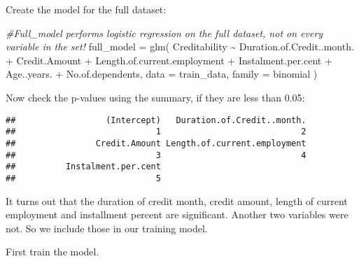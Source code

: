 \documentclass[
]{article}
\newenvironment{Shaded}{\begin{snugshade}}{\end{snugshade}}
\newcommand{\AttributeTok}[1]{\textcolor[rgb]{0.77,0.63,0.00}{#1}}
\newcommand{\CommentTok}[1]{\textcolor[rgb]{0.56,0.35,0.01}{\textit{#1}}}
\newcommand{\DecValTok}[1]{\textcolor[rgb]{0.00,0.00,0.81}{#1}}
\newcommand{\FloatTok}[1]{\textcolor[rgb]{0.00,0.00,0.81}{#1}}
\newcommand{\FunctionTok}[1]{\textcolor[rgb]{0.00,0.00,0.00}{#1}}
\newcommand{\NormalTok}[1]{#1}
\newcommand{\OtherTok}[1]{\textcolor[rgb]{0.56,0.35,0.01}{#1}}
\newcommand{\SpecialCharTok}[1]{\textcolor[rgb]{0.00,0.00,0.00}{#1}}
\begin{document}
Create the model for the full dataset:

\begin{Shaded}
\begin{Highlighting}[]
\CommentTok{\#Full\_model performs logistic regression on the full dataset, not on every variable in the set!}
\NormalTok{full\_model }\OtherTok{=} \FunctionTok{glm}\NormalTok{(}
\NormalTok{                  Creditability }\SpecialCharTok{\textasciitilde{}}\NormalTok{ Duration.of.Credit..month.}
                            \SpecialCharTok{+}\NormalTok{ Credit.Amount}
                            \SpecialCharTok{+}\NormalTok{ Length.of.current.employment}
                            \SpecialCharTok{+}\NormalTok{ Instalment.per.cent}
                            \SpecialCharTok{+}\NormalTok{ Age..years.}
                            \SpecialCharTok{+}\NormalTok{ No.of.dependents, }
                  \AttributeTok{data =}\NormalTok{ train\_data, }
                  \AttributeTok{family =}\NormalTok{ binomial}
\NormalTok{                 )}
\end{Highlighting}
\end{Shaded}

Now check the p-values using the summary, if they are less than 0.05:

\begin{Shaded}
\end{Shaded}

\begin{verbatim}
##                  (Intercept)   Duration.of.Credit..month. 
##                            1                            2 
##                Credit.Amount Length.of.current.employment 
##                            3                            4 
##          Instalment.per.cent 
##                            5
\end{verbatim}

It turns out that the duration of credit month, credit amount, length of
current employment and installment percent are significant. Another two
variables were not. So we include those in our training model.

First train the model.
\end{document}
